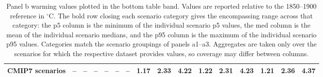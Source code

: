 \begin{table}[tp]
{\begin{tabular}{lrrrrrrrrrrrrrrr}
\midrule
\textbf{CMIP7 scenarios} & \textbf{--} & \textbf{--} & \textbf{--} & \textbf{--} & \textbf{--} & \textbf{--} & \textbf{1.17} & \textbf{2.33} & \textbf{4.22} & \textbf{1.22} & \textbf{2.31} & \textbf{4.23} & \textbf{1.21} & \textbf{2.36} & \textbf{4.37} \\
\bottomrule
\end{tabular}%
}
\caption{Panel b warming values plotted in the bottom table band. Values are reported relative to the 1850--1900 reference in $^{\circ}$C. The bold row closing each scenario category gives the encompassing range across that category: the p5 column is the minimum of the individual scenario p5 values, the med column is the mean of the individual scenario medians, and the p95 column is the maximum of the individual scenario p95 values. Categories match the scenario groupings of panels a1--a3. Aggregates are taken only over the scenarios for which the respective dataset provides values, so coverage may differ between columns.}
\label{tab:observational_alignment_panel_b_values}
\end{table}

